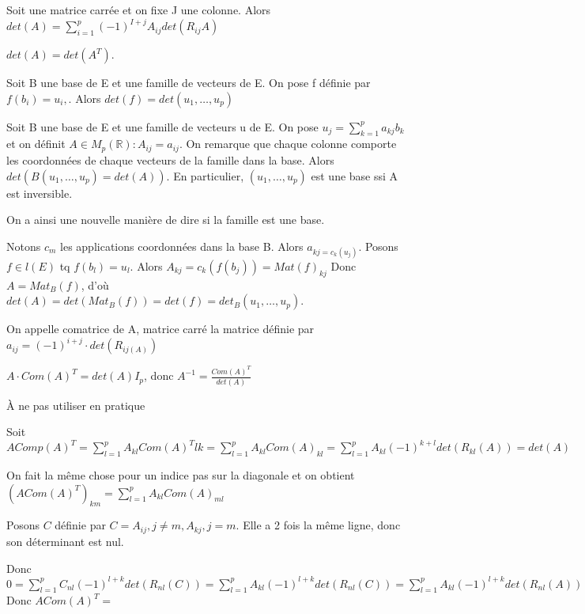 \documentclass[french]{yLectureNote}
\newcommand{\R}[0]{\mathbb{R}}
\begin{document}
\begin{proposition}
Soit une matrice carrée et on fixe J une colonne. Alors \(det(A) = \sum_{i=1}^p (-1)^{I+j}A_{ij}det(R_{ij}A)\)
\end{proposition}
\begin{proposition}
\(det(A) = det(A^T)\).
\end{proposition}
\begin{proposition}
Soit B une base de E et une famille de vecteurs de E. On pose f définie par \(f(b_i) = u_i,\). Alors \(det(f) = det(u_1,\dots, u_p)\)
\end{proposition}
\begin{proposition}[Corollaire ]
Soit B une base de E et une famille de vecteurs u de E. On pose \(u_j = \sum_{k=1}^p a_{kj}b_k\) et on définit \(A\in M_p(\R) : A_{ij} = a_{ij}\). On remarque que chaque colonne comporte les coordonnées de chaque vecteurs de la famille dans la base. Alors \(det(B(u_1,\dots, u_p)=det(A))\). En particulier, \((u_1,\dots, u_p)\) est une base ssi A est inversible.
\end{proposition}
On a ainsi une nouvelle manière de dire si la famille est une base.
\begin{myproof}
 Notons \(c_m\) les applications coordonnées dans la base B.  Alors \(a_{kj = c_k(u_j)}\). Posons \(f\in l(E)\) tq \(f(b_l) = u_l\). Alors \(A_{kj} = c_k(f(b_j)) = Mat(f)_{kj}\) Donc \(A = Mat_B(f)\), d'où \(det(A) = det(Mat_B(f)) = det(f) = det_B(u_1,\dots, u_p)\).
\end{myproof}
\begin{definition}[Comatrice]
On appelle comatrice de A, matrice carré la matrice définie par \(a_{ij} = (-1)^{i+j}\cdot det(R_{ij(A)})\)
\end{definition}
\begin{proposition}
\(A\cdot Com(A)^T = det(A)I_p\), donc \(A^{-1} = \frac{Com(A)^T}{det(A)}\)
\end{proposition}
À ne pas utiliser en pratique

\begin{myproof}
 Soit \(A Comp(A)^T = \sum_{l=1}^p A_{kl}Com(A)^T{lk} = \sum^p_{l=1} A_{kl} Com(A)_{kl} = \sum_{l=1}^p A_{kl} (-1)^{k+l} det(R_{kl}(A)) = det(A)\)

 On fait la m\^eme chose pour un indice pas sur la diagonale et on obtient \((A Com(A)^T)_{km} = \sum_{l=1}^p A_{kl} Com(A)_{ml}\)

 Posons \(C\) définie par \(C = A_{ij}, j\neq m, A_{kj}, j=m\). Elle a 2 fois la m\^eme ligne, donc son déterminant est nul.

 Donc \(0 = \sum^p_{l=1}C_{nl}(-1)^{l+k} det(R_{nl}(C)) = \sum^p_{l=1}A_{kl}(-1)^{l+k} det(R_{nl}(C)) = \sum^p_{l=1}A_{kl}(-1)^{l+k} det(R_{nl}(A)) = \sum^p_{l=1}A_{kl}Com(A)_{ml})\) Donc \(ACom(A)^T = \)
\end{myproof}
\end{document}
